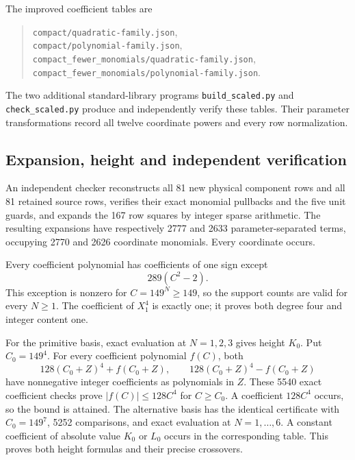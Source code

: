 \documentclass[11pt,a4paper]{article}
\begin{document}
The improved coefficient tables are
\begin{quote}\small\raggedright
\nolinkurl{compact/quadratic-family.json},\\
\nolinkurl{compact/polynomial-family.json},\\
\nolinkurl{compact_fewer_monomials/quadratic-family.json},\\
\nolinkurl{compact_fewer_monomials/polynomial-family.json}.
\end{quote}
The two additional standard-library programs
\nolinkurl{build_scaled.py} and \nolinkurl{check_scaled.py}
produce and independently verify these tables. Their parameter
transformations record all twelve coordinate powers and every row
normalization.

\subsection{Expansion, height and independent verification}
An independent checker reconstructs all 81 new physical component rows
and all 81 retained source rows, verifies their exact monomial
pullbacks and the five unit guards, and expands the 167 row squares by
integer sparse arithmetic. The resulting expansions have respectively
2777 and 2633 parameter-separated terms, occupying 2770 and 2626
coordinate monomials. Every coordinate occurs.

Every coefficient polynomial has coefficients of one sign except
\[
                             289(C^2-2).
\]
This exception is nonzero for $C=149^N\ge149$, so the support counts are
valid for every $N\ge1$. The coefficient of $X_1^4$ is exactly one;
it proves both degree four and integer content one.

For the primitive basis, exact evaluation at $N=1,2,3$ gives height
$K_0$. Put $C_0=149^4$. For every coefficient polynomial $f(C)$, both
\[
                   128(C_0+Z)^4+f(C_0+Z),\qquad
                   128(C_0+Z)^4-f(C_0+Z)
\]
have nonnegative integer coefficients as polynomials in $Z$. These
5540 exact coefficient checks prove $|f(C)|\le128C^4$ for $C\ge C_0$.
A coefficient $128C^4$ occurs, so the bound is attained. The alternative
basis has the identical certificate with $C_0=149^7$, 5252 comparisons,
and exact evaluation at $N=1,\ldots,6$. A constant coefficient of absolute
value $K_0$ or $L_0$ occurs in the corresponding table. This proves both
height formulas and their precise crossovers.
\end{document}
